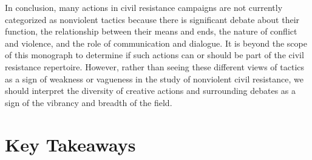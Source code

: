 \documentclass[twoside,a4paper,12pt,fleqn,openany]{extbook}
\begin{document}
In conclusion, many actions in civil resistance campaigns are not currently categorized as nonviolent tactics because there is significant debate about their function, the relationship between their means and ends, the nature of conflict and violence, and the role of communication and dialogue. It is beyond the scope of this monograph to determine if such actions can or should be part of the civil resistance repertoire. However, rather than seeing these different views of tactics as a sign of weakness or vagueness in the study of nonviolent civil resistance, we should interpret the diversity of creative actions and surrounding debates as a sign of the vibrancy and breadth of the field.

\chapter{Key Takeaways}
\end{document}
